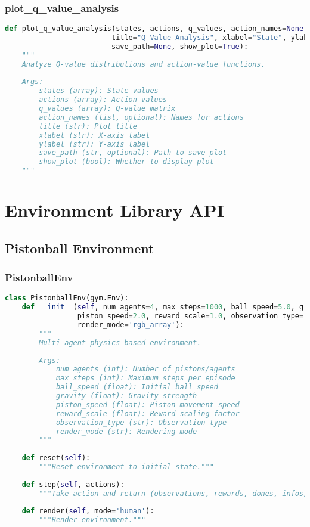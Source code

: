 \subsubsection{plot\_q\_value\_analysis}

\begin{lstlisting}[language=python]
def plot_q_value_analysis(states, actions, q_values, action_names=None,
                         title="Q-Value Analysis", xlabel="State", ylabel="Q-Value",
                         save_path=None, show_plot=True):
    """
    Analyze Q-value distributions and action-value functions.
    
    Args:
        states (array): State values
        actions (array): Action values
        q_values (array): Q-value matrix
        action_names (list, optional): Names for actions
        title (str): Plot title
        xlabel (str): X-axis label
        ylabel (str): Y-axis label
        save_path (str, optional): Path to save plot
        show_plot (bool): Whether to display plot
    """
\end{lstlisting}

\section{Environment Library API}

\subsection{Pistonball Environment}

\subsubsection{PistonballEnv}

\begin{lstlisting}[language=python]
class PistonballEnv(gym.Env):
    def __init__(self, num_agents=4, max_steps=1000, ball_speed=5.0, gravity=0.5,
                 piston_speed=2.0, reward_scale=1.0, observation_type='vector',
                 render_mode='rgb_array'):
        """
        Multi-agent physics-based environment.
        
        Args:
            num_agents (int): Number of pistons/agents
            max_steps (int): Maximum steps per episode
            ball_speed (float): Initial ball speed
            gravity (float): Gravity strength
            piston_speed (float): Piston movement speed
            reward_scale (float): Reward scaling factor
            observation_type (str): Observation type
            render_mode (str): Rendering mode
        """
    
    def reset(self):
        """Reset environment to initial state."""
    
    def step(self, actions):
        """Take action and return (observations, rewards, dones, infos)."""
    
    def render(self, mode='human'):
        """Render environment."""
\end{lstlisting}

